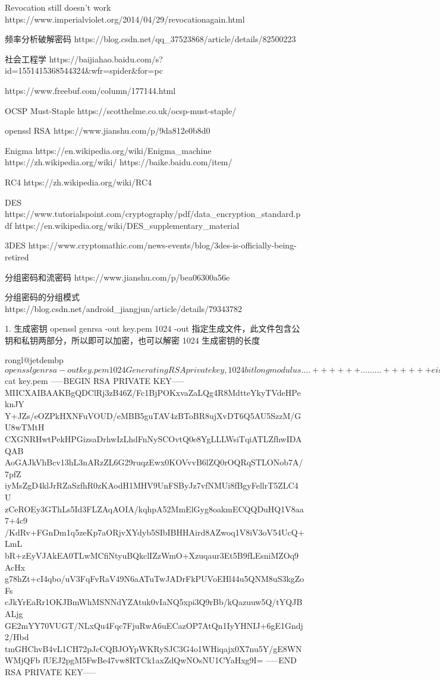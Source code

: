 
Revocation still doesn't work
https://www.imperialviolet.org/2014/04/29/revocationagain.html

频率分析破解密码
https://blog.csdn.net/qq_37523868/article/details/82500223

社会工程学
https://baijiahao.baidu.com/s?id=1551415368544324&wfr=spider&for=pc


https://www.freebuf.com/column/177144.html


OCSP Must-Staple
https://scotthelme.co.uk/ocsp-must-staple/


openssl RSA
https://www.jianshu.com/p/9da812e0b8d0

Enigma
https://en.wikipedia.org/wiki/Enigma_machine
https://zh.wikipedia.org/wiki/%
https://baike.baidu.com/item/%

RC4
https://zh.wikipedia.org/wiki/RC4

DES
https://www.tutorialspoint.com/cryptography/pdf/data_encryption_standard.pdf
https://en.wikipedia.org/wiki/DES_supplementary_material

3DES
https://www.cryptomathic.com/news-events/blog/3des-is-officially-being-retired

分组密码和流密码
https://www.jianshu.com/p/bea06300a56e

分组密码的分组模式
https://blog.csdn.net/android_jiangjun/article/details/79343782


1. 生成密钥
openssl genrsa -out key.pem 1024
    -out 指定生成文件，此文件包含公钥和私钥两部分，所以即可以加密，也可以解密
    1024 生成密钥的长度

    rongl@jetdembp ~ $ openssl genrsa -out key.pem 1024
    Generating RSA private key, 1024 bit long modulus
    ....++++++
    .........++++++
    e is 65537 (0x10001)
    rongl@jetdembp ~ $ cat key.pem
    -----BEGIN RSA PRIVATE KEY-----
    MIICXAIBAAKBgQDClRj3zB46Z/Fc1BjPOKxvaZaLQg4R8MdtteYkyTVdeHPeknJY
    Y+JZs/eOZPkHXNFuVOUD/eMBB5guTAV4zBToBR8ujXvDT6Q5AU5SzzM/GU8wTMtH
    CXGNRHwtPekHPGizsaDrhwIzLhdFnNySCOvtQ0e8YgLLLWsiTqiATLZfhwIDAQAB
    AoGAJkVhBcv13hL3nARzZL6G29ruqzEwx0KOVvvB6lZQ0rOQRqSTLONob7A/7pfZ
    iyMsZgD4klJrRZaSzfhR0zKAodH1MHV9UnFSByJz7vfNMUi8fBgyFellrT5ZLC4U
    zCeROEy3GThLs5Id3FLZAqAOIA/kqhpA52MmElGyg8oakmECQQDuHQ1V8aa7+4c9
    /KdRv+FGnDm1q5zeKp7aORjvXYdyb5SIbIBHHAird8AZwoq1V8iV3oV54UcQ+LmL
    bR+zEyVJAkEA0TLwMCfiNtyuBQkclIZzWmO+Xzuqaur3Et5B9fLEsniMZOq9AcHx
    g78hZt+cI4qbo/uV3FqFvRaV49N6aATuTwJADrFkPUVoEHl44u5QNM8uS3kgZoFs
    cJkYrEaRr1OKJBmWhMSNNdYZAtuk0vIaNQ5xpi3Q9rBb/kQazuuw5Q/tYQJBALjg
    GE2mYY70VUGT/NLxQu4Fqc7FjuRwA6uECazOP7AtQn1IyYHNIJ+6gE1Gndj2/Hbd
    tmGHChvB4vL1CH72pJcCQBJOYpWKRySJC3G4o1WHiqajx0X7nu5Y/gE8WNWMjQFb
    fUEJ2pgM5FwBe47vw8RTCk1axZdQwNOsNU1CYaHxg9I=
    -----END RSA PRIVATE KEY-----


